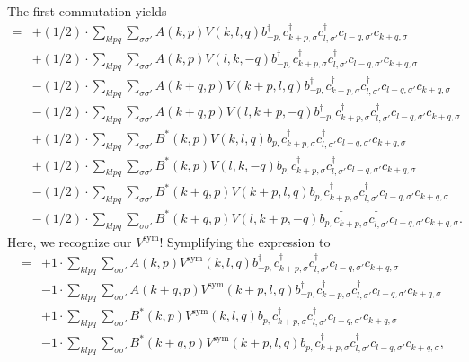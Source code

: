 The first commutation yields
\begin{align*}
	[\eta, H_\mathrm{C}] = 	&+(1/2) \cdot \sum_{ k l p q } \sum_{ \sigma \sigma' } A( k, p )  V( k, l, q )   b_{ -p, }^\dagger  c_{ k+p, \sigma }^\dagger  c_{ l, \sigma' }^\dagger  c_{ l-q, \sigma' } c_{ k+q, \sigma }  \\
	&+(1/2) \cdot \sum_{ k l p q } \sum_{ \sigma \sigma' } A( k, p )  V( l, k, -q )   b_{ -p, }^\dagger  c_{ k+p, \sigma }^\dagger  c_{ l, \sigma' }^\dagger  c_{ l-q, \sigma' } c_{ k+q, \sigma }  \\
	&-(1/2) \cdot \sum_{ k l p q } \sum_{ \sigma \sigma' } A( k+q, p )  V( k+p, l, q )   b_{ -p, }^\dagger  c_{ k+p, \sigma }^\dagger  c_{ l, \sigma' }^\dagger  c_{ l-q, \sigma' } c_{ k+q, \sigma }  \\
	&-(1/2) \cdot \sum_{ k l p q } \sum_{ \sigma \sigma' } A( k+q, p )  V( l, k+p, -q )   b_{ -p, }^\dagger  c_{ k+p, \sigma }^\dagger  c_{ l, \sigma' }^\dagger  c_{ l-q, \sigma' } c_{ k+q, \sigma }  \\
	&+(1/2) \cdot \sum_{ k l p q } \sum_{ \sigma \sigma' } B^*( k, p )  V( k, l, q )   b_{ p, } c_{ k+p, \sigma }^\dagger  c_{ l, \sigma' }^\dagger  c_{ l-q, \sigma' } c_{ k+q, \sigma }  \\
	&+(1/2) \cdot \sum_{ k l p q } \sum_{ \sigma \sigma' } B^*( k, p )  V( l, k, -q )   b_{ p, } c_{ k+p, \sigma }^\dagger  c_{ l, \sigma' }^\dagger  c_{ l-q, \sigma' } c_{ k+q, \sigma }  \\
	&-(1/2) \cdot \sum_{ k l p q } \sum_{ \sigma \sigma' } B^*( k+q, p )  V( k+p, l, q )   b_{ p, } c_{ k+p, \sigma }^\dagger  c_{ l, \sigma' }^\dagger  c_{ l-q, \sigma' } c_{ k+q, \sigma }  \\
	&-(1/2) \cdot \sum_{ k l p q } \sum_{ \sigma \sigma' } B^*( k+q, p )  V( l, k+p, -q )   b_{ p, } c_{ k+p, \sigma }^\dagger  c_{ l, \sigma' }^\dagger  c_{ l-q, \sigma' } c_{ k+q, \sigma } 
. \end{align*}
Here, we recognize our $V^\mathrm{sym}$! Symplifying the expression to
\begin{align*}
	[\eta, H_\mathrm{C}] = 	&+1 \cdot \sum_{ k l p q } \sum_{ \sigma \sigma' } A( k, p )  V^\mathrm{sym}( k, l, q )   b_{ -p, }^\dagger  c_{ k+p, \sigma }^\dagger  c_{ l, \sigma' }^\dagger  c_{ l-q, \sigma' } c_{ k+q, \sigma }  \\
	&-1 \cdot \sum_{ k l p q } \sum_{ \sigma \sigma' } A( k+q, p )  V^\mathrm{sym}( k+p, l, q )   b_{ -p, }^\dagger  c_{ k+p, \sigma }^\dagger  c_{ l, \sigma' }^\dagger  c_{ l-q, \sigma' } c_{ k+q, \sigma }  \\
	&+1 \cdot \sum_{ k l p q } \sum_{ \sigma \sigma' } B^*( k, p )  V^\mathrm{sym}( k, l, q )   b_{ p, } c_{ k+p, \sigma }^\dagger  c_{ l, \sigma' }^\dagger  c_{ l-q, \sigma' } c_{ k+q, \sigma }  \\
	&-1 \cdot \sum_{ k l p q } \sum_{ \sigma \sigma' } B^*( k+q, p )  V^\mathrm{sym}( k+p, l, q )   b_{ p, } c_{ k+p, \sigma }^\dagger  c_{ l, \sigma' }^\dagger  c_{ l-q, \sigma' } c_{ k+q, \sigma } 
, \end{align*}
